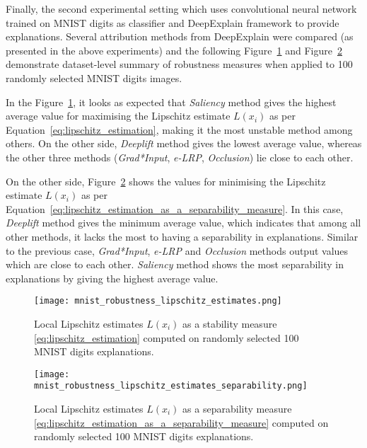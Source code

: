 \documentclass[english]{tktltiki2}
\theoremstyle{definition}
\theoremstyle{remark}
\begin{document}
Finally, the second experimental setting which uses convolutional neural network trained on MNIST digits as classifier and DeepExplain framework to provide explanations. Several attribution methods from DeepExplain were compared (as presented in the above experiments) and the following Figure~\ref{fig:mnist_robustness_lipschitz_estimates} and Figure~\ref{fig:mnist_robustness_lipschitz_estimates_separability} demonstrate dataset-level summary of robustness measures when applied to 100 randomly selected MNIST digits images.

In the Figure~\ref{fig:mnist_robustness_lipschitz_estimates}, it looks as expected that \textit{Saliency} method gives the highest average value for maximising the Lipschitz estimate $L(x_i)$ as per Equation~\eqref{eq:lipschitz_estimation}, making it the most unstable method among others.  On the other side, \textit{Deeplift} method gives the lowest average value, whereas the other three methods (\textit{Grad*Input}, \textit{e-LRP}, \textit{Occlusion}) lie close to each other.

On the other side, Figure~\ref{fig:mnist_robustness_lipschitz_estimates_separability} shows the values for minimising the Lipschitz estimate $L(x_i)$ as per Equation~\eqref{eq:lipschitz_estimation_as_a_separability_measure}. In this case, \textit{Deeplift} method gives the minimum average value, which indicates that among all other methods, it lacks the most to having a separability in explanations. Similar to the previous case, \textit{Grad*Input}, \textit{e-LRP} and \textit{Occlusion} methods output values which are close to each other. \textit{Saliency} method shows the most separability in explanations by giving the highest average value.

\begin{figure}[H]
	\texttt{[image: mnist\_robustness\_lipschitz\_estimates.png]}
	\vspace*{-5mm}
	\caption{Local Lipschitz estimates $L(x_i)$ as a stability measure \eqref{eq:lipschitz_estimation} computed on randomly selected 100 MNIST digits explanations.}
	\label{fig:mnist_robustness_lipschitz_estimates}
\end{figure}


\begin{figure}[H]
	\texttt{[image: mnist\_robustness\_lipschitz\_estimates\_separability.png]}
	\vspace*{-5mm}
	\caption{Local Lipschitz estimates $L(x_i)$ as a separability measure \eqref{eq:lipschitz_estimation_as_a_separability_measure} computed on randomly selected 100 MNIST digits explanations.}
	\label{fig:mnist_robustness_lipschitz_estimates_separability}
\end{figure} 
\end{document}
